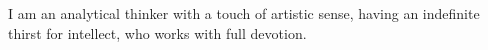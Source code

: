 

\begin{cvparagraph}

I am an analytical thinker with a touch of artistic sense, having an indefinite thirst for intellect, who works with full devotion.
\end{cvparagraph}
